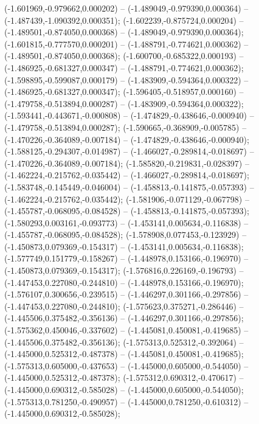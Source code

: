  (-1.601969,-0.979662,0.000202) -- (-1.489049,-0.979390,0.000364) -- (-1.487439,-1.090392,0.000351);
 (-1.602239,-0.875724,0.000204) -- (-1.489501,-0.874050,0.000368) -- (-1.489049,-0.979390,0.000364);
 (-1.601815,-0.777570,0.000201) -- (-1.488791,-0.774621,0.000362) -- (-1.489501,-0.874050,0.000368);
 (-1.600700,-0.685322,0.000193) -- (-1.486925,-0.681327,0.000347) -- (-1.488791,-0.774621,0.000362);
 (-1.598895,-0.599087,0.000179) -- (-1.483909,-0.594364,0.000322) -- (-1.486925,-0.681327,0.000347);
 (-1.596405,-0.518957,0.000160) -- (-1.479758,-0.513894,0.000287) -- (-1.483909,-0.594364,0.000322);
 (-1.593441,-0.443671,-0.000808) -- (-1.474829,-0.438646,-0.000940) -- (-1.479758,-0.513894,0.000287);
 (-1.590665,-0.368909,-0.005785) -- (-1.470226,-0.364089,-0.007184) -- (-1.474829,-0.438646,-0.000940);
 (-1.588125,-0.294307,-0.014987) -- (-1.466027,-0.289814,-0.018697) -- (-1.470226,-0.364089,-0.007184);
 (-1.585820,-0.219831,-0.028397) -- (-1.462224,-0.215762,-0.035442) -- (-1.466027,-0.289814,-0.018697);
 (-1.583748,-0.145449,-0.046004) -- (-1.458813,-0.141875,-0.057393) -- (-1.462224,-0.215762,-0.035442);
 (-1.581906,-0.071129,-0.067798) -- (-1.455787,-0.068095,-0.084528) -- (-1.458813,-0.141875,-0.057393);
 (-1.580293,0.003161,-0.093773) -- (-1.453141,0.005634,-0.116838) -- (-1.455787,-0.068095,-0.084528);
 (-1.578908,0.077453,-0.123929) -- (-1.450873,0.079369,-0.154317) -- (-1.453141,0.005634,-0.116838);
 (-1.577749,0.151779,-0.158267) -- (-1.448978,0.153166,-0.196970) -- (-1.450873,0.079369,-0.154317);
 (-1.576816,0.226169,-0.196793) -- (-1.447453,0.227080,-0.244810) -- (-1.448978,0.153166,-0.196970);
 (-1.576107,0.300656,-0.239515) -- (-1.446297,0.301166,-0.297856) -- (-1.447453,0.227080,-0.244810);
 (-1.575623,0.375271,-0.286446) -- (-1.445506,0.375482,-0.356136) -- (-1.446297,0.301166,-0.297856);
 (-1.575362,0.450046,-0.337602) -- (-1.445081,0.450081,-0.419685) -- (-1.445506,0.375482,-0.356136);
 (-1.575313,0.525312,-0.392064) -- (-1.445000,0.525312,-0.487378) -- (-1.445081,0.450081,-0.419685);
 (-1.575313,0.605000,-0.437653) -- (-1.445000,0.605000,-0.544050) -- (-1.445000,0.525312,-0.487378);
 (-1.575312,0.690312,-0.470617) -- (-1.445000,0.690312,-0.585028) -- (-1.445000,0.605000,-0.544050);
 (-1.575313,0.781250,-0.490957) -- (-1.445000,0.781250,-0.610312) -- (-1.445000,0.690312,-0.585028);
